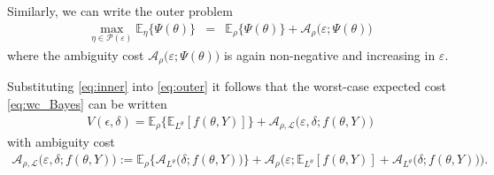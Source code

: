 \documentclass[11pt,reqno,letter]{amsart}
\theoremstyle{plain}
\theoremstyle{definition}
\numberwithin{equation}{section}
\numberwithin{theorem}{section}
\numberwithin{table}{section}
\numberwithin{figure}{section}
\begin{document}
Similarly, we can write the outer problem
\begin{eqnarray}
\max_{\eta \in {\mathcal P}(\varepsilon)} {\mathbb E}_\eta \big\{\Psi(\theta) \big\} & = & {\mathbb E}_\rho \big\{\Psi(\theta) \big\} + {\mathcal A}_{\rho}\big(\varepsilon; \Psi(\theta)\big)
\label{eq:outer}
\end{eqnarray}
where the ambiguity cost ${\mathcal A}_{\rho}\big(\varepsilon; \Psi(\theta)\big)$ is again non-negative and increasing in $\varepsilon$.


Substituting \eqref{eq:inner} into \eqref{eq:outer} it  follows that the worst-case expected cost \ref{eq:wc_Bayes} can be written
\begin{eqnarray*}
V(\epsilon, \delta)  = {\mathbb E}_\rho \Big\{{\mathbb E}_{L^\theta}[f(\theta, Y)]  \Big\} + {\mathcal A}_{\rho,{\mathcal L}}\big(\varepsilon, \delta; f(\theta, Y)\big)
\end{eqnarray*}
with ambiguity cost
\begin{eqnarray*}
{\mathcal A}_{\rho,{\mathcal L}}\big(\varepsilon, \delta; f(\theta, Y)\big) := {\mathbb E}_\rho \Big\{ {\mathcal A}_{L^\theta}\big(\delta; f(\theta, Y)\big) \Big\} + {\mathcal A}_{\rho}\Big(\varepsilon; {\mathbb E}_{L^\theta}[f(\theta, Y)]  + {\mathcal A}_{L^\theta}\big(\delta; f(\theta, Y)\big)\Big).
\end{eqnarray*}
\end{document}

